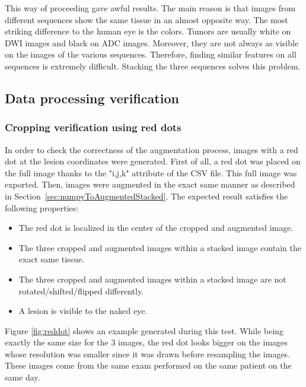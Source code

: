 This way of proceeding gave awful results. The main reason is that images from different sequences show the same tissue in an almost opposite way. The most striking difference to the human eye is the colors. Tumors are usually white on DWI images and black on ADC images. Moreover, they are not always as visible on the images of the various sequences. Therefore, finding similar features on all sequences is extremely difficult. Stacking the three sequences solves this problem. 


\subsection{Data processing verification}
\label{sec:dataProcessingVerification}
\subsubsection{Cropping verification using red dots}
\setlength{\marginparwidth}{3cm}\leavevmode {}In order to check the correctness of the augmentation process, images with a red dot at the lesion coordinates were generated. First of all, a red dot was placed on the full image thanks to the "i,j,k" attribute of the CSV file. This full image was exported. Then, images were augmented in the exact same manner as described in \mbox{Section \ref{sec:numpyToAugmentedStacked}}. The expected result satisfies the following properties:
\begin{itemize}
	\item The red dot is localized in the center of the cropped and augmented image.
	\item The three cropped and augmented images within a stacked image contain the exact same tissue. 
	\item The three cropped and augmented images within a stacked image are not rotated/shifted/flipped differently. 
	\item A lesion is visible to the naked eye. 
\end{itemize}

\noindent Figure \ref{fig:reddot} shows an example generated during this test. While being exactly the same size for the 3 images, the red dot looks bigger on the images whose resolution was smaller since it was drawn before resampling the images. These images come from the same exam performed on the same patient on the same day. 

